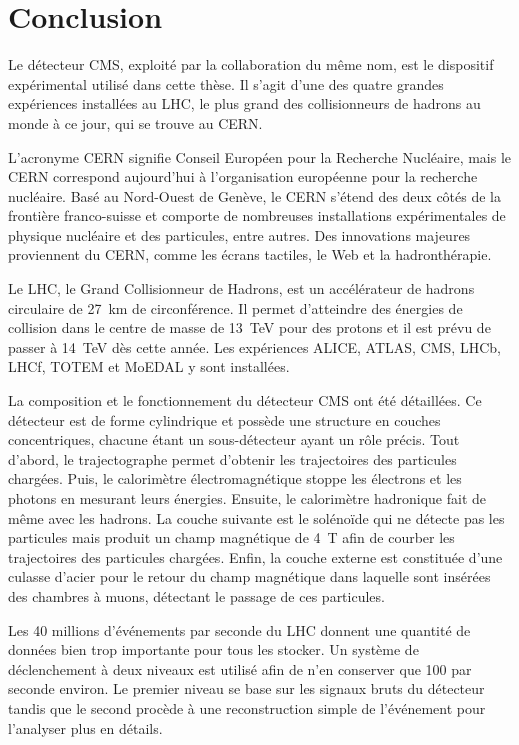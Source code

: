 \section{Conclusion}\label{chapter-LHC-section-conclusion}
Le détecteur CMS, exploité par la collaboration du même nom, est le dispositif expérimental utilisé dans cette thèse.
Il s'agit d'une des quatre grandes expériences installées au LHC, le plus grand des collisionneurs de hadrons au monde à ce jour, qui se trouve au CERN.
\par L'acronyme \og CERN \fg{} signifie Conseil Européen pour la Recherche Nucléaire, mais le CERN correspond aujourd'hui à l'organisation européenne pour la recherche nucléaire.
Basé au Nord-Ouest de Genève, le CERN s'étend des deux côtés de la frontière franco-suisse et comporte de nombreuses installations expérimentales de physique nucléaire et des particules, entre autres.
Des innovations majeures proviennent du CERN, comme les écrans tactiles, le Web et la hadronthérapie.
\par Le LHC, le Grand Collisionneur de Hadrons, est un accélérateur de hadrons circulaire de \SI{27}{\kilo\meter} de circonférence.
Il permet d'atteindre des énergies de collision dans le centre de masse de \SI{13}{\TeV} pour des protons et il est prévu de passer à \SI{14}{\TeV} dès cette année.
Les expériences ALICE, ATLAS, CMS, LHCb, LHCf, TOTEM et MoEDAL y sont installées.
\par La composition et le fonctionnement du détecteur CMS ont été détaillées.
Ce détecteur est de forme cylindrique et possède une structure en couches concentriques, chacune étant un sous-détecteur ayant un rôle précis.
Tout d'abord, le trajectographe permet d'obtenir les trajectoires des particules chargées.
Puis, le calorimètre électromagnétique stoppe les électrons et les photons en mesurant leurs énergies.
Ensuite, le calorimètre hadronique fait de même avec les hadrons.
La couche suivante est le solénoïde qui ne détecte pas les particules mais produit un champ magnétique de \SI{4}{\tesla} afin de courber les trajectoires des particules chargées.
Enfin, la couche externe est constituée d'une culasse d'acier pour le retour du champ magnétique dans laquelle sont insérées des chambres à muons, détectant le passage de ces particules.
\par Les 40 millions d'événements par seconde du LHC donnent une quantité de données bien trop importante pour tous les stocker.
Un système de déclenchement à deux niveaux est utilisé afin de n'en conserver que 100 par seconde environ.
Le premier niveau se base sur les signaux bruts du détecteur tandis que le second procède à une reconstruction simple de l'événement pour l'analyser plus en détails.
